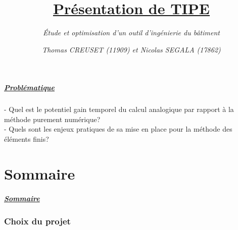 \documentclass[10pt]{beamer}
\author[\textit{Thomas CREUSET}]{\textit{Thomas CREUSET (11909) et Nicolas SEGALA (17862)}}
\title{\uline{Pr\'esentation de TIPE}}
\subtitle{\textit{\'Etude et optimisation d’un outil d'ing\'enierie du b\^atiment}}
\date[\textit{num\'ero de candidat  : 11909}]{}
\begin{document}
	\frame{\titlepage}

	\begin{frame}
		\frametitle{\uline{Probl\'ematique}}
		\begin{block}{}
			- Quel est le potentiel gain temporel du calcul analogique par rapport à la méthode purement
numérique?\\
			- Quels sont les enjeux pratiques de sa mise en place pour la méthode des éléments
finis?
		\end{block}
	\end{frame}

	\part{Sommaire}
	\begin{frame}
		\frametitle{\uline{Sommaire}}
		\tableofcontents
	\end{frame}

	\section{Choix du projet}
\end{document}
